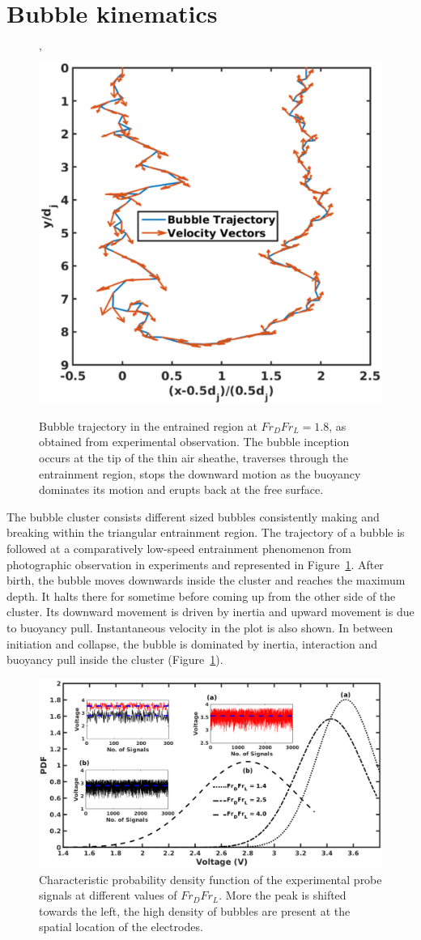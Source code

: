 \section{Bubble kinematics}
\begin{figure}
	\centering'
	\includegraphics[width=0.5\linewidth]{chapters/jetPool/Figure19}
	\caption{Bubble trajectory in the entrained region at $Fr_DFr_L = 1.8$, as obtained from experimental observation. The bubble inception occurs at the tip of the thin air sheathe, traverses through the entrainment region, stops the downward motion as the buoyancy dominates its motion and erupts back at the free surface.}
	\label{Figure::bubble}
\end{figure}
The bubble cluster consists different sized bubbles consistently making and breaking within the triangular entrainment region. The trajectory of a bubble is followed at a comparatively low-speed entrainment phenomenon from photographic observation in experiments and represented in Figure~\ref{Figure::bubble}. After birth, the bubble moves downwards inside the cluster and reaches the maximum depth. It halts there for sometime before coming up from the other side of the cluster. Its downward movement is driven by inertia and upward movement is due to buoyancy pull. Instantaneous velocity in the plot is also shown. In between initiation and collapse, the bubble is dominated by inertia, interaction and buoyancy pull inside the cluster (Figure~\ref{Figure::bubble}). \\
\begin{figure}
	\centering
	\includegraphics[width=\linewidth]{chapters/jetPool/Figure20}
	\caption{Characteristic probability density function of the experimental probe signals at different values of $Fr_DFr_L$. More the peak is shifted towards the left, the high density of bubbles are present at the spatial location of the electrodes.}
	\label{Figure::pdf}
\end{figure}
